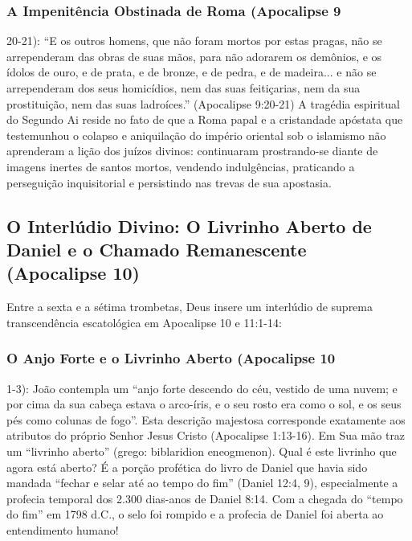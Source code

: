 \subsubsection*{A Impenitência Obstinada de Roma (Apocalipse 9}
20-21):
``E os outros homens, que não foram mortos por estas pragas, não se arrependeram das obras de suas mãos, para não adorarem os demônios, e os ídolos de ouro, e de prata, e de bronze, e de pedra, e de madeira... e não se arrependeram dos seus homicídios, nem das suas feitiçarias, nem da sua prostituição, nem das suas ladroíces.'' (Apocalipse 9:20-21)
A tragédia espiritual do Segundo Ai reside no fato de que a Roma papal e a cristandade apóstata que testemunhou o colapso e aniquilação do império oriental sob o islamismo não aprenderam a lição dos juízos divinos: continuaram prostrando-se diante de imagens inertes de santos mortos, vendendo indulgências, praticando a perseguição inquisitorial e persistindo nas trevas de sua apostasia.



\subsection{O Interlúdio Divino: O Livrinho Aberto de Daniel e o Chamado Remanescente (Apocalipse 10)}


Entre a sexta e a sétima trombetas, Deus insere um interlúdio de suprema transcendência escatológica em Apocalipse 10 e 11:1-14:


\subsubsection*{O Anjo Forte e o Livrinho Aberto (Apocalipse 10}
1-3):
João contempla um ``anjo forte descendo do céu, vestido de uma nuvem; e por cima da sua cabeça estava o arco-íris, e o seu rosto era como o sol, e os seus pés como colunas de fogo''. Esta descrição majestosa corresponde exatamente aos atributos do próprio Senhor Jesus Cristo (Apocalipse 1:13-16).
Em Sua mão traz um ``livrinho aberto'' (grego: biblaridion eneogmenon). Qual é este livrinho que agora está aberto?
É a porção profética do livro de Daniel que havia sido mandada ``fechar e selar até ao tempo do fim'' (Daniel 12:4, 9), especialmente a profecia temporal dos 2.300 dias-anos de Daniel 8:14. Com a chegada do ``tempo do fim'' em 1798 d.C., o selo foi rompido e a profecia de Daniel foi aberta ao entendimento humano!


